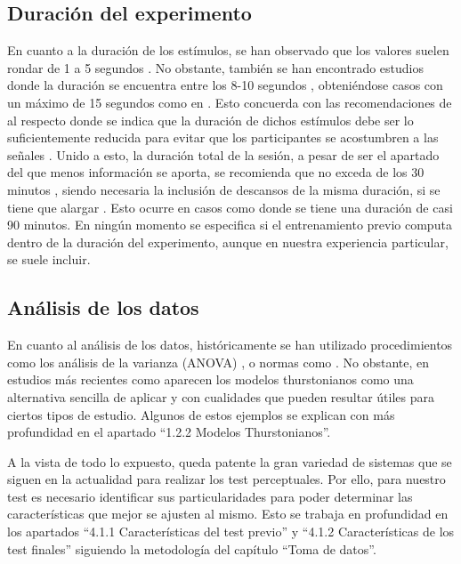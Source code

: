 \documentclass[11pt,a4paper]{book}
\begin{document}
        \subsection{Duración del experimento}
    		En cuanto a la duración de los estímulos, se han observado que los valores suelen rondar de 1 a 5 segundos \cite{2010FMartellotta, 2016SKlockgether, 2011VEmiya, 2019LKritly, 2019GPulvirenti, 2002PZahorik, 2019MShiell, 2019JGroose, 2019MNowak, 2019MYamada, 2019DMorikawa, 2019DJSchlit}. No obstante, también se han encontrado estudios donde la duración se encuentra entre los 8-10 segundos \cite{2010FMartellotta, 2019JLee, 2010MVigeant}, obteniéndose casos con un máximo de 15 segundos como en \cite{1995GASoulodre, 2005IWitew}. Esto concuerda con las recomendaciones de \cite{UIT1116,UIT1534, UIT1284,EBU3286, UIT1285, UIT1286} al respecto donde se indica que la duración de dichos estímulos debe ser lo suficientemente reducida para evitar que los participantes se acostumbren a las señales \cite{GelfandStanley}. Unido a esto, la duración total de la sesión, a pesar de ser el apartado del que menos información se aporta, se recomienda que no exceda de los 30 minutos , siendo necesaria la inclusión de descansos de la misma duración, si se tiene que alargar \cite{UIT1116, UIT1284, UIT1534, ZwickerFactsModels, GelfandStanley, BlauertSpatialHearing}. Esto ocurre en casos como \cite{2019LKritly} donde se tiene una duración de casi 90 minutos. En ningún momento se especifica si el entrenamiento previo computa dentro de la duración del experimento, aunque en nuestra experiencia particular, se suele incluir.
    
	    \subsection{Análisis de los datos}
    		En cuanto al análisis de los datos, históricamente se han utilizado procedimientos como los análisis de la varianza (ANOVA) \cite{2011VEmiya, 2016BPostma, 2019LKritly, 2019GPulvirenti, 2019MShiell, 2019VHongisto}, o normas como \cite{ISO10399}. No obstante, en estudios más recientes como \cite{delaPrida2019, delaPrida2021} aparecen los modelos thurstonianos como una alternativa sencilla de aplicar y con cualidades que pueden resultar útiles para ciertos tipos de estudio. Algunos de estos ejemplos se explican con más profundidad en el apartado ``1.2.2 Modelos Thurstonianos''.\newline
    
    A la vista de todo lo expuesto, queda patente la gran variedad de sistemas que se siguen en la actualidad para realizar los test perceptuales. Por ello, para nuestro test es necesario identificar sus particularidades para poder determinar las características que mejor se ajusten al mismo. Esto se trabaja en profundidad en los apartados ``4.1.1 Características del test previo'' y ``4.1.2 Características de los test finales'' siguiendo la metodología del capítulo ``Toma de datos''.
    
\end{document}
